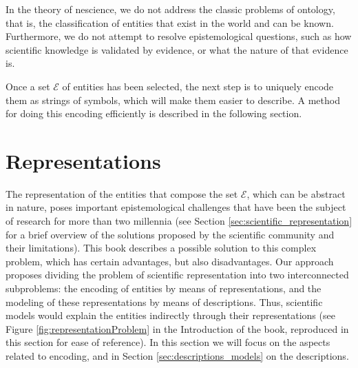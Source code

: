 In the theory of nescience, we do not address the classic problems of ontology, that is, the classification of entities that exist in the world and can be known. Furthermore, we do not attempt to resolve epistemological questions, such as how scientific knowledge is validated by evidence, or what the nature of that evidence is.

Once a set $\mathcal{E}$ of entities has been selected, the next step is to uniquely encode them as strings of symbols, which will make them easier to describe. A method for doing this encoding efficiently is described in the following section.

%
%

\section{Representations}
\label{sec:representations}

The representation of the entities that compose the set $\mathcal{E}$, which can be abstract in nature, poses important epistemological challenges that have been the subject of research for more than two millennia (see Section \ref{sec:scientific_representation} for a brief overview of the solutions proposed by the scientific community and their limitations). This book describes a possible solution to this complex problem, which has certain advantages, but also disadvantages. Our approach proposes dividing the problem of scientific representation into two interconnected subproblems: the encoding of entities by means of representations, and the modeling of these representations by means of descriptions. Thus, scientific models would explain the entities indirectly through their representations (see Figure \ref{fig:representationProblem} in the Introduction of the book, reproduced in this section for ease of reference). In this section we will focus on the aspects related to encoding, and in Section \ref{sec:descriptions_models} on the descriptions.

% 

